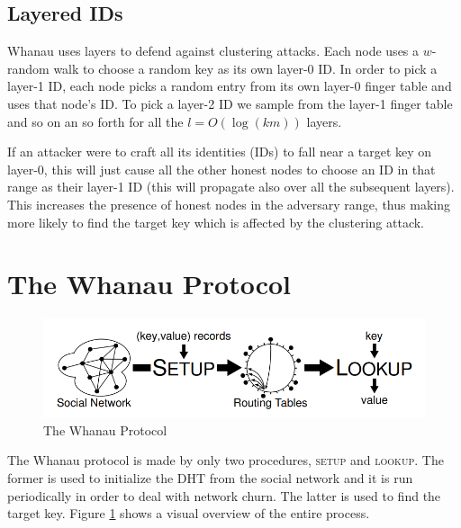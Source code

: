 \subsection{Layered IDs}
Whanau uses layers to defend against clustering attacks. Each node uses a $w$-random walk to choose a random key as its own layer-0 ID. In order to pick a layer-1 ID, each node picks a random entry from its own layer-0 finger table and uses that node's ID. To pick a layer-2 ID we sample from the layer-1 finger table and so on an so forth for all the $l = O(\log(km))$ layers.  

If an attacker were to craft all its identities (IDs) to fall near a target key on layer-0, this will just cause all the other honest nodes to choose an ID in that range as their layer-1 ID (this will propagate also over all the subsequent layers).  This increases the presence of honest nodes in the adversary range, thus making more likely to find the target key which is affected by the clustering attack. 

\section{The Whanau Protocol \label{prot}}

\begin{figure}[h]
    \centering
    \includegraphics[width=\linewidth]{whanau.png}
    \caption{The Whanau Protocol}
    \label{fig:whanau_protocol}
\end{figure}

The Whanau protocol is made by only two procedures, \textsc{setup} and \textsc{lookup}. The former is used to initialize the DHT from the social network and it is run periodically in order to deal with network churn. The latter is used to find the target key. Figure \ref{fig:whanau_protocol} shows a visual overview of the entire process.

